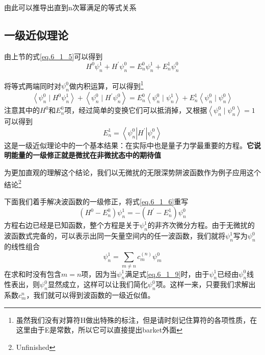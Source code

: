         由此可以推导出直到n次幂满足的等式关系
    \subsection{一级近似理论}
        由上节的式\ref{eq.6_1_5}可以得到
        \begin{equation}
            \label{eq.6_1_6}
            H^{0} \psi_{n}^{1}+H^{\prime} \psi_{n}^{0}=E_{n}^{0} \psi_{n}^{1}+E_{n}^{1} \psi_{n}^{0}
        \end{equation}

        将等式两端同时对$\psi_n^0$做内积运算，可以得到\footnote{虽然我们没有对算符H做出特殊的标注，但是请时刻记住算符的各项性质，在这里由于E是常数，所以它可以直接提出barket外面}
        \begin{equation}
            \left\langle\psi_{n}^{0} \mid H^{0} \psi_{n}^{1}\right\rangle+\left\langle\psi_{n}^{0} \mid H^{\prime} \psi_{n}^{0}\right\rangle=E_{n}^{0}\left\langle\psi_{n}^{0} \mid \psi_{n}^{1}\right\rangle+E_{n}^{1}\left\langle\psi_{n}^{0} \mid \psi_{n}^{0}\right\rangle
        \end{equation}
        注意其中的$H^0$和$E^0_n$项，经过简单的变换它们可以抵消掉，又根据$\left\langle\psi_{n}^{0} \mid \psi_{n}^{0}\right\rangle=1$可以得到
        \begin{equation}
            \label{eq.6_1_8}
            \boxed{E_{n}^{1}=\left\langle\psi_{n}^{0}\left|H^{\prime}\right| \psi_{n}^{0}\right\rangle}
        \end{equation}
        这是一级近似理论中的一个基本结果：在实际中也是量子力学最重要的方程。\textbf{它说明能量的一级修正就是微扰在非微扰态中的期待值}

        为更加直观的理解这个结论，我们以无微扰的无限深势阱波函数作为例子应用这个结论\footnote{Unfinished}

        下面我们着手解决波函数的一级修正，将式\ref{eq.6_1_6}重写
        \begin{equation}
            \label{eq.6_1_9}
            \left(H^{0}-E_{n}^{0}\right) \psi_{n}^{1}=-\left(H^{\prime}-E_{n}^{1}\right) \psi_{n}^{0}
        \end{equation}
        方程右边已经是已知函数，整个方程是关于$\psi^1_n$的非齐次微分方程。由于无微扰的波函数式完备的，可以表示出同一矢量空间内的任一波函数，我们就将$\psi^1_n$写为$\psi^0_n$的线性组合
        \begin{equation}
            \label{eq.6_1_10}
            \psi_{n}^{1}=\sum_{m \neq n} c_{m}^{(n)} \psi_{m}^{0}
        \end{equation}
        在求和时没有包含$m=n$项，因为当$\psi^1_n$满足式\ref{eq.6_1_9}时，由于$\psi^1_n$已经由$\psi^0_n$线性表出，则$\psi^0_n$显然成立，这样可以让我们简化$\psi^0_n$项。这样一来，只要我们求解出系数$c_m^n$，我们就可以得到波函数的一级近似值。

